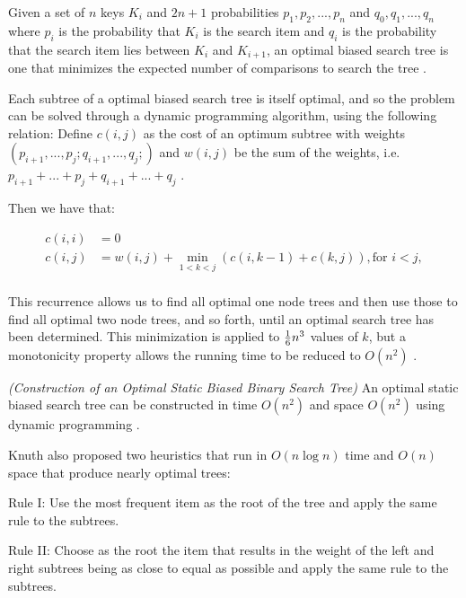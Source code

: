 \documentclass[mcs]{scsthesis}
\begin{document}
Given a set of $n$ keys \(K_i\) and \(2n + 1\) probabilities
\(p_1, p_2, ..., p_n\) and \(q_0, q_1, ..., q_n\) where \(p_i\) is the
probability that \(K_i\) is the search item and \(q_i\) is the
probability that the search item lies between \(K_i\) and \(K_{i+1}\), an
optimal biased search tree is one that minimizes the expected number of
comparisons to search the tree \cite{knuth}. %

Each subtree of a optimal biased search tree is itself optimal, and so the
problem can be solved through a dynamic programming algorithm, using the
following relation: Define \( c(i,j)\) as the cost of an optimum subtree with
weights \((p_{i+1}, ..., p_j; q_{i+1}, ..., q_j;)\) and \(w(i, j)\) be the
sum of the weights, i.e. \(p_{i+1} + ... + p_j + q_{i + 1} + ... + q_j \)
\cite{knuth}.

Then we have that:

\begin{equation}
    \begin{aligned}
    c(i, i) & = 0 \\
    c(i, j) & = w(i, j) + \min_{1<k<j} (c(i, k - 1) + c(k, j)), \text{for } i<j, \\
    \end{aligned}
\end{equation}

This recurrence allows us to find all optimal one node trees and then use those
to find all optimal two node trees, and so forth, until an optimal search
tree has been determined. This minimization is applied to \({1\over{6}} n^{3} \)
values of \( k \), but a monotonicity property allows the running time to be
reduced to \( O(n^2) \) \cite{knuth}.

\begin{thm} \emph{(Construction of an Optimal Static Biased Binary Search Tree)} 
An optimal static biased search tree can be constructed in time \(O(n^2)\) and
space \(O(n^2)\) using dynamic programming \cite{knuth}.
\end{thm}

Knuth also proposed two heuristics that run in \(O(n \log n)\) time and
\(O(n)\) space that produce nearly optimal trees:

Rule I: Use the most frequent item as the root of the tree and apply the same
rule to the subtrees.

Rule II: Choose as the root the item that results in the weight of the left
and right subtrees being as close to equal as possible and apply the same
rule to the subtrees. 
\end{document}
